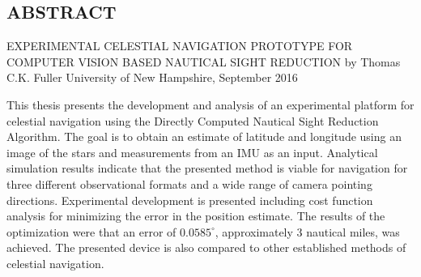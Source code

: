 \documentclass[12pt,a4paper]{book}
\begin{document}
\tableofcontents
\listoffigures
\listoftables
\newpage
\break
\begin{center}
\section*{ABSTRACT}

EXPERIMENTAL CELESTIAL NAVIGATION PROTOTYPE FOR COMPUTER VISION BASED NAUTICAL SIGHT REDUCTION\break
by\break
Thomas C.K. Fuller\break
University of New Hampshire, September 2016
\end{center}
This thesis presents the development and analysis of an experimental platform for celestial navigation using the Directly Computed Nautical Sight Reduction Algorithm.  The goal is to obtain an estimate of latitude and longitude using an image of the stars and measurements from an IMU as an input.  Analytical simulation results indicate that the presented method is viable for navigation for three different observational formats and a wide range of camera pointing directions.  Experimental development is presented including cost function analysis for minimizing the error in the position estimate.  The results of the optimization were that an error of $0.0585^{\circ}$, approximately 3 nautical miles, was achieved.  The presented device is also compared to other established methods of celestial navigation.
\end{document}
